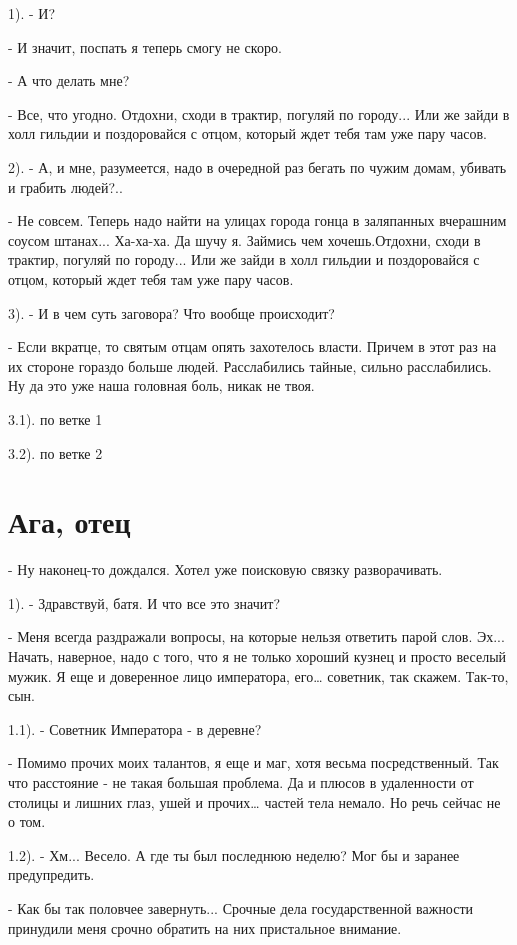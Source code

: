 \documentclass[12pt,a4paper]{book}
\begin{document}
1). - И?

- И значит, поспать я теперь смогу не скоро.

- А что делать мне?

- Все, что угодно. Отдохни, сходи в трактир, погуляй по городу... Или же зайди в холл гильдии и поздоровайся с отцом, который ждет тебя там уже пару часов.

2). - А, и мне, разумеется, надо в очередной раз бегать по чужим домам, убивать и грабить людей?..

- Не совсем. Теперь надо найти на улицах города гонца в заляпанных вчерашним соусом штанах... Ха-ха-ха. Да шучу я. Займись чем хочешь.Отдохни, сходи в трактир, погуляй по городу... Или же зайди в холл гильдии и поздоровайся с отцом, который ждет тебя там уже пару часов.

3). - И в чем суть заговора? Что вообще происходит?

- Если вкратце, то святым отцам опять захотелось власти. Причем в этот раз на их стороне гораздо больше людей. Расслабились тайные, сильно расслабились. Ну да это уже наша головная боль, никак не твоя.

3.1). по ветке 1

3.2). по ветке 2

\section{Ага, отец}

- Ну наконец-то дождался. Хотел уже поисковую связку разворачивать.

1). - Здравствуй, батя. И что все это значит?

- Меня всегда раздражали вопросы, на которые нельзя ответить парой слов. Эх... Начать, наверное, надо с того, что я не только хороший кузнец и просто веселый мужик. Я еще и доверенное лицо императора, его… советник, так скажем. Так-то, сын.

1.1). - Советник Императора - в деревне?

- Помимо прочих моих талантов, я еще и маг, хотя весьма посредственный. Так что расстояние - не такая большая проблема. Да и плюсов в удаленности от столицы и лишних глаз, ушей и прочих… частей тела немало. Но речь сейчас не о том.

1.2). - Хм... Весело. А где ты был последнюю неделю? Мог бы и заранее предупредить.

- Как бы так половчее завернуть... Срочные дела государственной важности принудили меня срочно обратить на них пристальное внимание.
\end{document}
